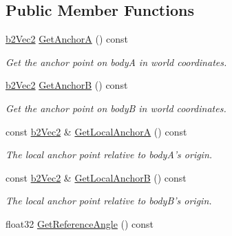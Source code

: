 \subsection*{Public Member Functions}
\begin{DoxyCompactItemize}
\item 
\hypertarget{classb2_revolute_joint_a7f266986c12009973fd74c9828b6c236}{\hyperlink{structb2_vec2}{b2\-Vec2} \hyperlink{classb2_revolute_joint_a7f266986c12009973fd74c9828b6c236}{Get\-Anchor\-A} () const }\label{classb2_revolute_joint_a7f266986c12009973fd74c9828b6c236}

\begin{DoxyCompactList}\small\item\em Get the anchor point on body\-A in world coordinates. \end{DoxyCompactList}\item 
\hypertarget{classb2_revolute_joint_a3a67ad189b29ea8ab6602a28697807f6}{\hyperlink{structb2_vec2}{b2\-Vec2} \hyperlink{classb2_revolute_joint_a3a67ad189b29ea8ab6602a28697807f6}{Get\-Anchor\-B} () const }\label{classb2_revolute_joint_a3a67ad189b29ea8ab6602a28697807f6}

\begin{DoxyCompactList}\small\item\em Get the anchor point on body\-B in world coordinates. \end{DoxyCompactList}\item 
\hypertarget{classb2_revolute_joint_af270a3029b2573bf85cde345c22d65ab}{const \hyperlink{structb2_vec2}{b2\-Vec2} \& \hyperlink{classb2_revolute_joint_af270a3029b2573bf85cde345c22d65ab}{Get\-Local\-Anchor\-A} () const }\label{classb2_revolute_joint_af270a3029b2573bf85cde345c22d65ab}

\begin{DoxyCompactList}\small\item\em The local anchor point relative to body\-A's origin. \end{DoxyCompactList}\item 
\hypertarget{classb2_revolute_joint_a985f788cffd53d7bb926b11cf77734e4}{const \hyperlink{structb2_vec2}{b2\-Vec2} \& \hyperlink{classb2_revolute_joint_a985f788cffd53d7bb926b11cf77734e4}{Get\-Local\-Anchor\-B} () const }\label{classb2_revolute_joint_a985f788cffd53d7bb926b11cf77734e4}

\begin{DoxyCompactList}\small\item\em The local anchor point relative to body\-B's origin. \end{DoxyCompactList}\item 
\hypertarget{classb2_revolute_joint_acfe881247b1f1f8f12aefd3a8f0cfd00}{float32 \hyperlink{classb2_revolute_joint_acfe881247b1f1f8f12aefd3a8f0cfd00}{Get\-Reference\-Angle} () const }\label{classb2_revolute_joint_acfe881247b1f1f8f12aefd3a8f0cfd00}


\end{DoxyCompactItemize}
